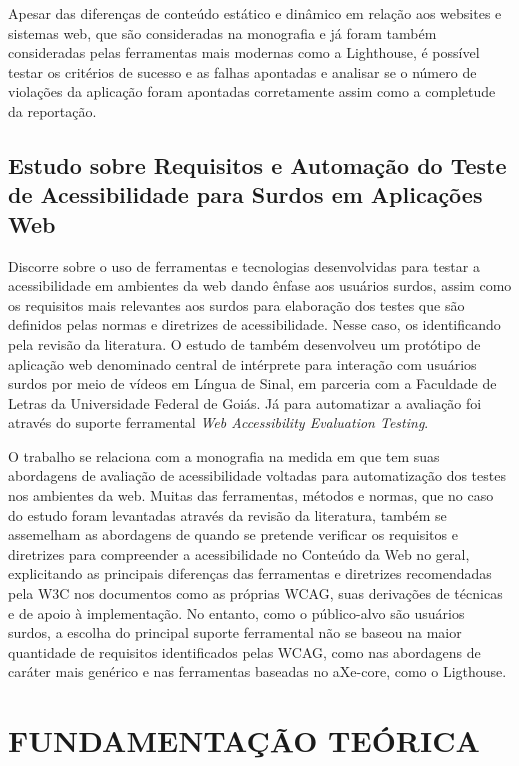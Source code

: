 \documentclass[
	12pt,				%
	openright,			%
	oneside,			%
	a4paper,			%
	chapter=TITLE,		%
	section=TITLE,		%
	subsection=TITLE,	%
	subsubsection=TITLE,%
	english,			%
	brazil				%
	]{abntex2}
\theoremstyle{definition}
\begin{document}
Apesar das diferenças de conteúdo estático e dinâmico em relação aos websites e sistemas web, que são consideradas na monografia e já foram também consideradas pelas ferramentas mais modernas como a Lighthouse, é possível testar os critérios de sucesso e as falhas apontadas e analisar se o número de violações da aplicação foram apontadas corretamente assim como a completude da reportação.


\section{Estudo sobre Requisitos e Automação do Teste de Acessibilidade para Surdos em Aplicações Web}

Discorre sobre o uso de ferramentas e tecnologias desenvolvidas para testar a acessibilidade em ambientes da web dando ênfase aos usuários surdos, assim como os requisitos mais relevantes aos surdos para elaboração dos testes que são definidos pelas normas e diretrizes de acessibilidade. Nesse caso, os identificando pela revisão da literatura. O estudo de \cite{sousa2020estudo} também desenvolveu um protótipo de aplicação web denominado central de intérprete para interação com usuários surdos por meio de vídeos em Língua de Sinal, em parceria com a Faculdade de Letras da Universidade Federal de Goiás. Já para automatizar a avaliação foi através do suporte ferramental \textit{Web Accessibility Evaluation Testing}.

O trabalho se relaciona com a monografia na medida em que tem suas abordagens de avaliação de acessibilidade voltadas para automatização dos testes nos ambientes da web. Muitas das ferramentas, métodos e normas, que no caso do estudo foram levantadas através da revisão da literatura, também se assemelham as abordagens de quando se pretende verificar os requisitos e diretrizes para compreender a acessibilidade no Conteúdo da Web no geral, explicitando as principais diferenças das ferramentas e diretrizes recomendadas pela W3C nos documentos como as próprias WCAG, suas derivações de técnicas e de apoio à implementação. No entanto, como o público-alvo são usuários surdos, a escolha do principal suporte ferramental não se baseou na maior quantidade de requisitos identificados pelas WCAG, como nas abordagens de caráter mais genérico e nas ferramentas baseadas no aXe-core, como o Ligthouse.


\chapter{FUNDAMENTAÇÃO TEÓRICA}
\end{document}
